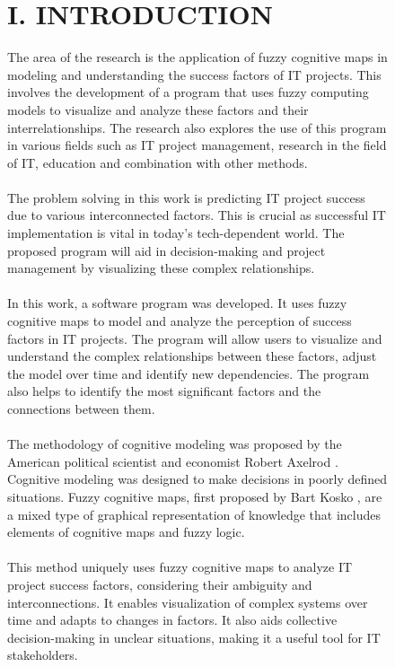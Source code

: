 \documentclass{article}
\begin{document}
\begin{figure}[!t]
\begin{minipage}{0.49\textwidth}
\begin{center}
                \chapter{I. INTRODUCTION}
            \end{center}
            The area of the research is the application of fuzzy cognitive maps in modeling and understanding the success factors of IT projects. This involves the development of a program that uses fuzzy computing models to visualize and analyze these factors and their interrelationships. The research also explores the use of this program in various fields such as IT project management, research in the field of IT, education and combination with other methods.\\
            ~\\
            The problem solving in this work is predicting IT project success due to various interconnected factors. This is crucial as successful IT implementation is vital in today's tech-dependent world. The proposed program will aid in decision-making and project management by visualizing these complex relationships.\\
            ~\\
            In this work, a software program was developed. It uses fuzzy cognitive maps to model and analyze the perception of success factors in IT projects. The program will allow users to visualize and understand the complex relationships between these factors, adjust the model over time and identify new dependencies. The program also helps to identify the most significant factors and the connections between them.\\
            ~\\
            The methodology of cognitive modeling was proposed by the American political scientist and economist Robert Axelrod \cite{litlink12}. Cognitive modeling was designed to make decisions in poorly defined situations. Fuzzy cognitive maps, first proposed by Bart Kosko \cite{litlink13}, are a mixed type of graphical representation of knowledge that includes elements of cognitive maps and fuzzy logic.\\
            ~\\
            This method uniquely uses fuzzy cognitive maps to analyze IT project success factors, considering their ambiguity and interconnections. It enables visualization of complex systems over time and adapts to changes in factors. It also aids collective decision-making in unclear situations, making it a useful tool for IT stakeholders.\\

\end{minipage}
\end{figure}
\end{document}
